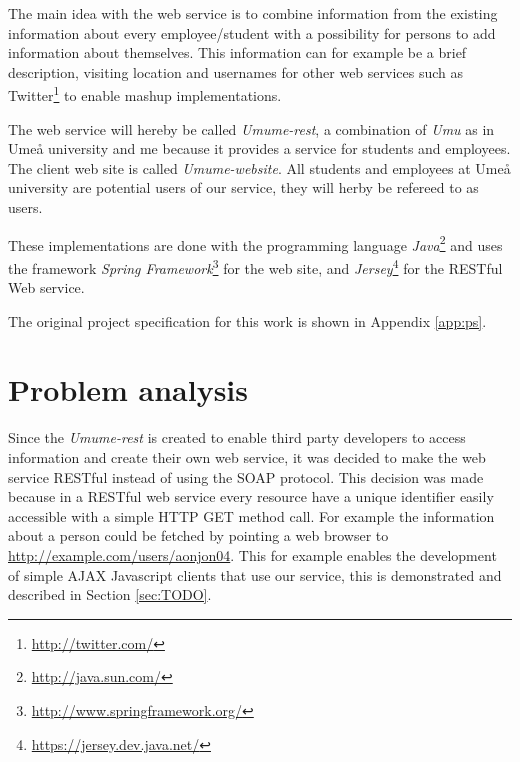 \documentclass[titlepage, twocolumn, a4paper, 10pt]{article}
\begin{document}
The main idea with the web service is to combine information from the existing information about every employee/student with a possibility for persons to add information about themselves. This information can for example be a brief description, visiting location and usernames for other web services such as Twitter\footnote{\url{http://twitter.com/}} to enable mashup implementations.

The web service will hereby be called \textit{Umume-rest}, a combination of \textit{Umu} as in Umeå university and {me} because it provides a service for students and employees. The client web site is called \textit{Umume-website}. All students and employees at Umeå university are potential users of our service, they will herby be refereed to as users.

These implementations are done with the programming language
\textit{Java}\footnote{\url{http://java.sun.com/}} and uses the framework \textit{Spring Framework}\footnote{\url{http://www.springframework.org/}} for the web site, and \textit{Jersey}\footnote{\url{https://jersey.dev.java.net/}} for the RESTful Web service.

The original project specification for this work is shown in Appendix \ref{app:ps}.

\section{Problem analysis}\label{sec:problem-analysis}
Since the \textit{Umume-rest} is created to enable third party developers to access information and create their own web service, it was decided to make the web service RESTful instead of using the SOAP protocol. This decision was made because in a RESTful web service every resource have a unique identifier easily accessible with a simple HTTP GET method call. For example the information about a person could be fetched by pointing a web browser to \url{http://example.com/users/aonjon04}. This for example enables the development of simple AJAX Javascript clients that use our service, this is demonstrated and described in Section \ref{sec:TODO}.
\end{document}
